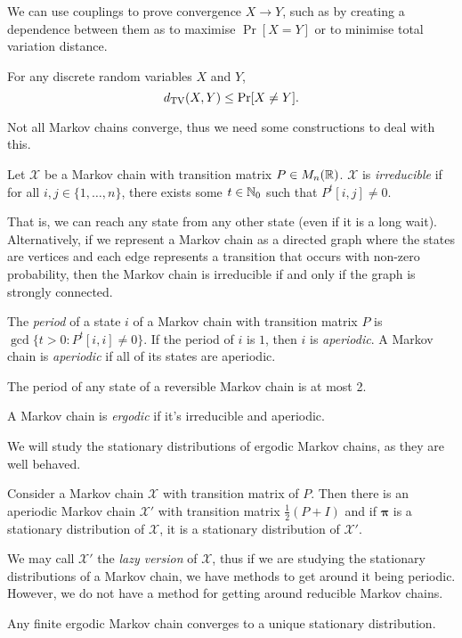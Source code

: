 We can use couplings to prove convergence $X \to Y$, such as by creating a dependence between them as to maximise $\Pr[X = Y]$ or to minimise total variation distance.

\begin{lemma}
    For any discrete random variables $X$ and $Y$,
    \[ d_{\text{TV}}(X,Y) \leq \Pr[X \neq Y]. \]
\end{lemma}

Not all Markov chains converge, thus we need some constructions to deal with this.

\begin{definition}[Irredubility]
    Let $\mathcal X$ be a Markov chain with transition matrix $P \in M_n(\mathbb R)$. $\mathcal X$ is \emph{irreducible} if for all $i,j \in \{1, \ldots, n\}$, there exists some $t \in \mathbb N_0$ such that $P^t[i,j] \neq 0$. 
\end{definition}

That is, we can reach any state from any other state (even if it is a long wait). Alternatively, if we represent a Markov chain as a directed graph where the states are vertices and each edge represents a transition that occurs with non-zero probability, then the Markov chain is irreducible if and only if the graph is strongly connected. 

\begin{definition}[Period]
    The \emph{period} of a state $i$ of a Markov chain with transition matrix $P$ is $\gcd\{t > 0: P^t[i,i] \neq 0\}$. If the period of $i$ is $1$, then $i$ is \emph{aperiodic}. A Markov chain is \emph{aperiodic} if all of its states are aperiodic.
\end{definition}

\begin{lemma}
    The period of any state of a reversible Markov chain is at most 2.
\end{lemma}

\begin{definition}[Ergodic]
    A Markov chain is \emph{ergodic} if it's irreducible and aperiodic. 
\end{definition}

We will study the stationary distributions of ergodic Markov chains, as they are well behaved.

\begin{lemma}
    Consider a Markov chain $\mathcal X$ with transition matrix of $P$. Then there is an aperiodic Markov chain $\mathcal X'$ with transition matrix $\frac12(P + I)$ and if $\bm\pi$ is a stationary distribution of $\mathcal X$, it is a stationary distribution of $\mathcal X'$.
\end{lemma}

We may call $\mathcal X'$ the \emph{lazy version} of $\mathcal X$, thus if we are studying the stationary distributions of a Markov chain, we have methods to get around it being periodic. However, we do not have a method for getting around reducible Markov chains.

\begin{theorem}
    Any finite ergodic Markov chain converges to a unique stationary distribution. 
\end{theorem}